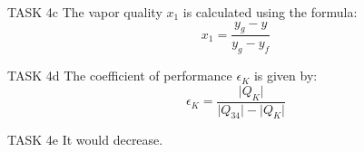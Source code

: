 TASK 4c  
The vapor quality \( x_1 \) is calculated using the formula:  
\[
x_1 = \frac{y_g - y}{y_g - y_f}
\]  

TASK 4d  
The coefficient of performance \( \epsilon_K \) is given by:  
\[
\epsilon_K = \frac{\lvert Q_K \rvert}{\lvert Q_{34} \rvert - \lvert Q_K \rvert}
\]  

TASK 4e  
It would decrease.